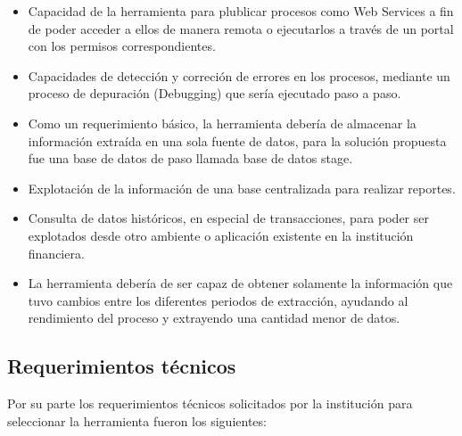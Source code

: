 \begin{itemize}
\item Capacidad de la herramienta para plublicar procesos como Web Services a
  fin de poder acceder a ellos de manera remota o ejecutarlos a través de un
  portal con los permisos correspondientes.

\item Capacidades de detección y correción de errores en los procesos, mediante
  un proceso de depuración (Debugging) que sería ejecutado paso a paso.

\item Como un requerimiento básico, la herramienta debería de almacenar la
  información extraída en una sola fuente de datos, para la solución propuesta
  fue una base de datos de paso llamada base de datos stage.

\item Explotación de la información de una base centralizada para realizar
  reportes.

\item Consulta de datos históricos, en especial de transacciones, para poder ser
  explotados desde otro ambiente o aplicación existente en la institución
  financiera.

\item La herramienta debería de ser capaz de obtener solamente la información
  que tuvo cambios entre los diferentes periodos de extracción, ayudando al
  rendimiento del proceso y extrayendo una cantidad menor de datos.
\end{itemize}

\subsection{Requerimientos técnicos}

Por su parte los requerimientos técnicos solicitados por la institución para
seleccionar la herramienta fueron los siguientes:


